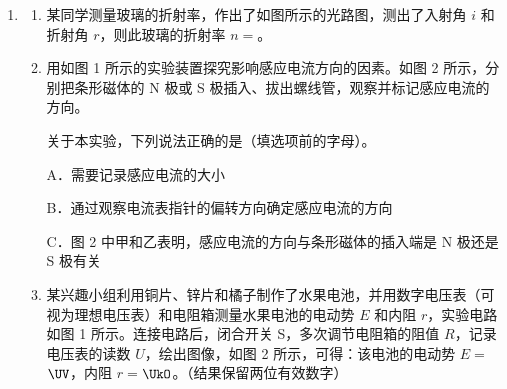 \documentclass[\gkver]{gaokaozhenti}
\begin{document}
\begin{enumerate}
{故选 A。
}

\item
\begin{enumerate}
	\item
	某同学测量玻璃的折射率，作出了如图所示的光路图，测出了入射角 $i$ 和折射角 $r$，则此玻璃的折射率 $n = $。
	\item
	用如图 1 所示的实验装置探究影响感应电流方向的因素。如图 2 所示，分别把条形磁体的 N 极或 S 极插入、拔出螺线管，观察并标记感应电流的方向。

	关于本实验，下列说法正确的是（填选项前的字母）。

	A．需要记录感应电流的大小

	B．通过观察电流表指针的偏转方向确定感应电流的方向

	C．图 2 中甲和乙表明，感应电流的方向与条形磁体的插入端是 N 极还是 S 极有关
	\item
	某兴趣小组利用铜片、锌片和橘子制作了水果电池，并用数字电压表（可视为理想电压表）和电阻箱测量水果电池的电动势 $E$ 和内阻 $r$，实验电路如图 1 所示。连接电路后，闭合开关 S，多次调节电阻箱的阻值 $R$，记录电压表的读数 $U$，绘出图像，如图 2 所示，可得：该电池的电动势 $E = $$\UV$，内阻 $r = $$\UkO$。（结果保留两位有效数字）
\end{enumerate}
\end{enumerate}
\end{document}
